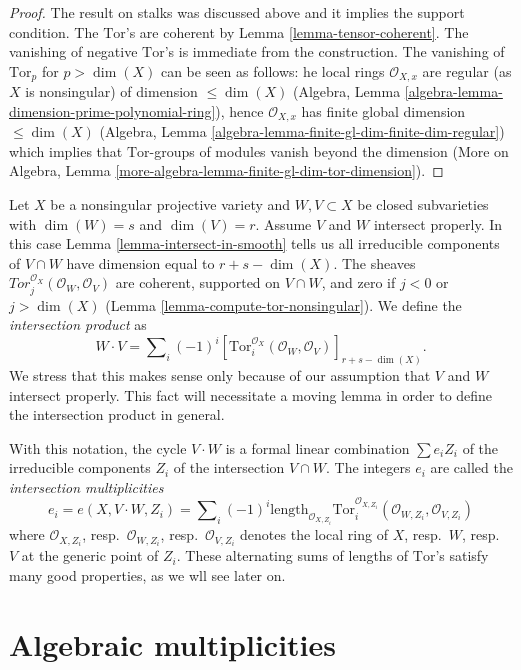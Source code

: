 \begin{proof}
The result on stalks was discussed above and it implies the support
condition. The $\text{Tor}$'s are coherent by
Lemma \ref{lemma-tensor-coherent}. The vanishing of negative
$\text{Tor}$'s is immediate from the construction. The
vanishing of $\text{Tor}_p$ for $p > \dim(X)$ can be seen as follows:
he local rings $\mathcal{O}_{X, x}$ are regular
(as $X$ is nonsingular) of dimension $\leq \dim(X)$
(Algebra, Lemma \ref{algebra-lemma-dimension-prime-polynomial-ring}),
hence $\mathcal{O}_{X, x}$ has finite global dimension $\leq \dim(X)$
(Algebra, Lemma \ref{algebra-lemma-finite-gl-dim-finite-dim-regular})
which implies that $\text{Tor}$-groups of modules vanish beyond the dimension
(More on Algebra, Lemma \ref{more-algebra-lemma-finite-gl-dim-tor-dimension}).
\end{proof}

\noindent
Let $X$ be a nonsingular projective variety and $W, V \subset X$
be closed subvarieties with $\dim(W) = s$ and $\dim(V) = r$.
Assume $V$ and $W$ intersect properly.
In this case Lemma \ref{lemma-intersect-in-smooth} tells us all irreducible
components of $V \cap W$ have dimension equal to $r + s - \dim(X)$.
The sheaves $Tor_j^{\mathcal{O}_X}(\mathcal{O}_W, \mathcal{O}_V)$ are
coherent, supported on $V \cap W$, and zero if $j < 0$ or $j > \dim(X)$
(Lemma \ref{lemma-compute-tor-nonsingular}).
We define the {\it intersection product} as
$$
W \cdot V = \sum\nolimits_i (-1)^i
[\text{Tor}_i^{\mathcal{O}_X}(\mathcal{O}_W, \mathcal{O}_V)]_{r + s - \dim(X)}.
$$
We stress that this makes sense only because of our assumption that
$V$ and $W$ intersect properly. This fact will necessitate a moving
lemma in order to define the intersection product in general.

\medskip\noindent
With this notation, the cycle $V \cdot W$ is a formal linear
combination $\sum e_i Z_i$ of the irreducible components $Z_i$
of the intersection $V \cap W$. The integers $e_i$ are called
the {\it intersection multiplicities}
$$
e_i = e(X, V \cdot W, Z_i) =
\sum\nolimits_i
(-1)^i
\text{length}_{\mathcal{O}_{X, Z_i}}
\text{Tor}_i^{\mathcal{O}_{X, Z_i}}(\mathcal{O}_{W, Z_i}, \mathcal{O}_{V, Z_i})
$$
where $\mathcal{O}_{X, Z_i}$, resp.\ $\mathcal{O}_{W, Z_i}$,
resp.\ $\mathcal{O}_{V, Z_i}$ denotes the local ring of $X$, resp.\ $W$,
resp.\ $V$ at the generic point of $Z_i$.
These alternating sums of lengths of $\text{Tor}$'s satisfy many good
properties, as we wll see later on.


\section{Algebraic multiplicities}
\label{section-multiplicities}

